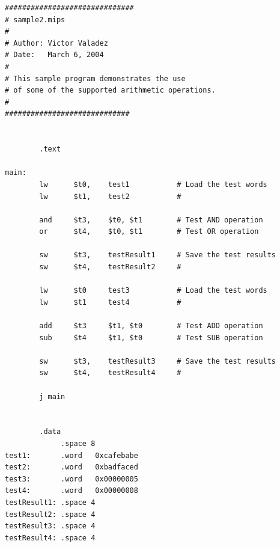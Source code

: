 \documentclass[]{spie}
\begin{document}
\begin{center}
\begin{verbatim}
##############################
# sample2.mips
#
# Author: Victor Valadez
# Date:   March 6, 2004
#
# This sample program demonstrates the use
# of some of the supported arithmetic operations.
# 
#############################


        .text   

main:           
        lw      $t0,    test1           # Load the test words
        lw      $t1,    test2           #
         
        and     $t3,    $t0, $t1        # Test AND operation
        or      $t4,    $t0, $t1        # Test OR operation

        sw      $t3,    testResult1     # Save the test results
        sw      $t4,    testResult2     # 
        
        lw      $t0     test3           # Load the test words
        lw      $t1     test4           #
        
        add     $t3     $t1, $t0        # Test ADD operation
        sub     $t4     $t1, $t0        # Test SUB operation
        
        sw      $t3,    testResult3     # Save the test results
        sw      $t4,    testResult4     # 
        
        j main

        
        .data 
             .space 8
test1:       .word   0xcafebabe
test2:       .word   0xbadfaced
test3:       .word   0x00000005
test4:       .word   0x00000008
testResult1: .space 4
testResult2: .space 4
testResult3: .space 4
testResult4: .space 4
\end{verbatim}
\end{center}
\end{document}
